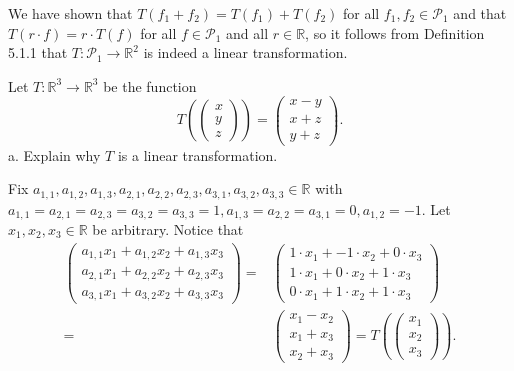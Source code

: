 \documentclass[12pt]{article}
\newenvironment{problem}[2][Problem]
{
	\begin{trivlist} 
		\item[\hskip \labelsep {\bfseries #1 #2:}]
	}
{
	\end{trivlist}
	}
\newenvironment{solution}[1][Solution]
{
	\begin{trivlist} 
		\item[\hskip \labelsep {\itshape #1:}]
	}
	{
	\end{trivlist}
}
\begin{document}
\begin{problem}{3}
\begin{solution}
We have shown that $T(f_1 + f_2) = T(f_1) + T(f_2)$ for all $f_1,f_2 \in \mathcal{P}_1$ and that $T(r\cdot f) = r\cdot T(f)$ for all $f \in \mathcal{P}_1$ and all $r \in \mathbb{R}$, so it follows from Definition 5.1.1 that $T: \mathcal{P}_1 \to \mathbb{R}^2$ is indeed a linear transformation.
\end{solution}
\end{problem}






\newpage
\begin{problem}{4}
Let $T:\mathbb{R}^3 \to \mathbb{R}^3$ be the function
\[
T\left(\begin{pmatrix} x\\y\\z\end{pmatrix} \right) = \begin{pmatrix} x-y\\x+z\\y+z\end{pmatrix} \text{.}
\]
\noindent
\newline
\newline
a. Explain why $T$ is a linear transformation.
\begin{solution}
Fix $a_{1,1},a_{1,2},a_{1,3},a_{2,1},a_{2,2},a_{2,3}, a_{3,1},a_{3,2},a_{3,3} \in \mathbb{R}$ with $a_{1,1}=a_{2,1}=a_{2,3}=a_{3,2}=a_{3,3}=1, a_{1,3}=a_{2,2}=a_{3,1}=0, a_{1,2}=-1$. Let $x_1,x_2,x_3 \in \mathbb{R}$ be arbitrary. Notice that
\begin{align*}
\begin{pmatrix} a_{1,1}x_1 + a_{1,2}x_2 + a_{1,3}x_3\\a_{2,1}x_1 + a_{2,2}x_2 + a_{2,3}x_3\\ a_{3,1}x_1 + a_{3,2}x_2 + a_{3,3}x_3 \end{pmatrix} =& \begin{pmatrix} 1\cdot x_1 + -1\cdot x_2 + 0\cdot x_3\\1\cdot x_1 + 0\cdot x_2 + 1\cdot x_3\\ 0\cdot x_1 + 1\cdot x_2 + 1\cdot x_3 \end{pmatrix}\\
=&\begin{pmatrix} x_1 -x_2 \\x_1 + x_3\\ x_2 + x_3 \end{pmatrix} = T\left( \begin{pmatrix} x_1\\x_2\\x_3 \end{pmatrix} \right) \text{.}

\end{align*}
\end{solution}
\end{problem}
\end{document}
